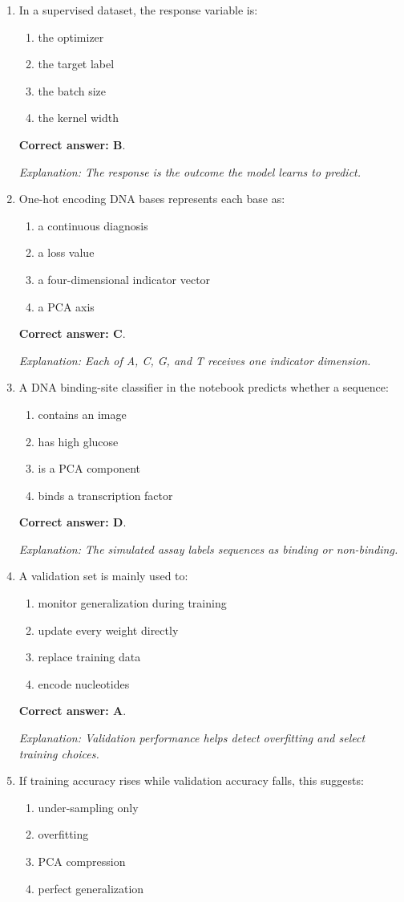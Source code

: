 \documentclass[10pt,a4paper]{article}
\newcommand{\ans}[1]{\par\textbf{Correct answer: #1}}
\newcommand{\expn}[1]{\par\textit{Explanation: #1}}
\begin{document}
\begin{enumerate}[label=\textbf{\arabic*.},itemsep=4pt]
\ans{A}. \expn{Binary cross-entropy is appropriate for binary probabilistic predictions.}
\item In a supervised dataset, the response variable is:
\begin{enumerate}[label=\Alph*.,itemsep=0pt]\item the optimizer\item the target label\item the batch size\item the kernel width\end{enumerate}
\ans{B}. \expn{The response is the outcome the model learns to predict.}
\item One-hot encoding DNA bases represents each base as:
\begin{enumerate}[label=\Alph*.,itemsep=0pt]\item a continuous diagnosis\item a loss value\item a four-dimensional indicator vector\item a PCA axis\end{enumerate}
\ans{C}. \expn{Each of A, C, G, and T receives one indicator dimension.}
\item A DNA binding-site classifier in the notebook predicts whether a sequence:
\begin{enumerate}[label=\Alph*.,itemsep=0pt]\item contains an image\item has high glucose\item is a PCA component\item binds a transcription factor\end{enumerate}
\ans{D}. \expn{The simulated assay labels sequences as binding or non-binding.}
\item A validation set is mainly used to:
\begin{enumerate}[label=\Alph*.,itemsep=0pt]\item monitor generalization during training\item update every weight directly\item replace training data\item encode nucleotides\end{enumerate}
\ans{A}. \expn{Validation performance helps detect overfitting and select training choices.}
\item If training accuracy rises while validation accuracy falls, this suggests:
\begin{enumerate}[label=\Alph*.,itemsep=0pt]\item under-sampling only\item overfitting\item PCA compression\item perfect generalization\end{enumerate}

\end{enumerate}
\end{document}
